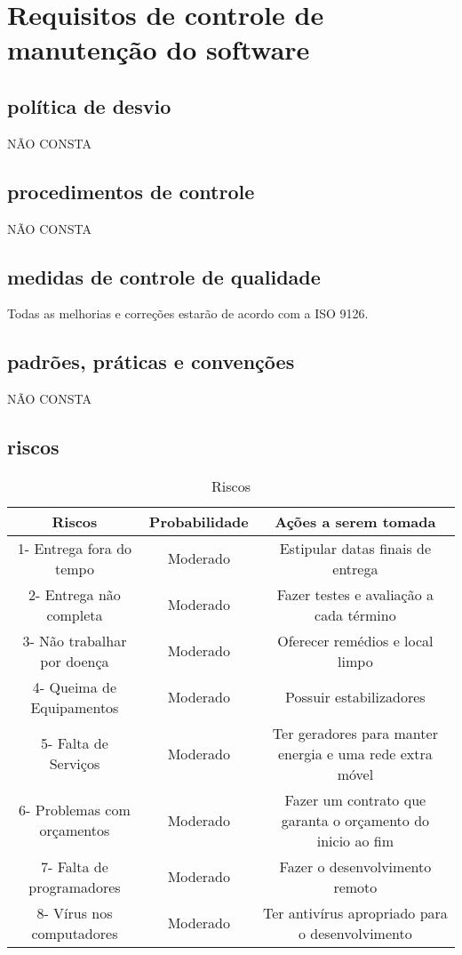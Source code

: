 \chapter{Requisitos de controle de manutenção do software}

\section{política de desvio}
NÃO CONSTA
\section{procedimentos de controle}
NÃO CONSTA
\section{medidas de controle de qualidade}
Todas as melhorias e correções  estarão de acordo com a ISO 9126.
\section{padrões, práticas e convenções}
NÃO CONSTA
\section{riscos}
\begin{table}[!htb]
	\caption[Riscos]{Riscos}
	\label{tab:riscos}
	\centering
	\begin{tabular}{c|c|c}
		Riscos                           &  Probabilidade        &  Ações a serem tomada		\\ \hline
		1- Entrega fora do tempo         &  Moderado             &  Estipular datas finais de entrega 	 \\
	  2- Entrega não completa          & 	Moderado	           &  Fazer testes e avaliação a cada término    \\
    3- Não trabalhar por doença      & 	Moderado	           &  Oferecer remédios e local limpo          	 \\
    4- Queima de Equipamentos		& Moderado		& Possuir estabilizadores 			\\
    5- Falta de Serviços		& Moderado 		& Ter geradores para manter energia e uma rede extra móvel \\
    6- Problemas com orçamentos		& Moderado		& Fazer um contrato que garanta o orçamento do inicio ao fim \\
    7- Falta de programadores		& Moderado		& Fazer o desenvolvimento remoto \\
    8- Vírus nos computadores		& Moderado		& Ter antivírus apropriado para o desenvolvimento \\
	\end{tabular}
\end{table}

